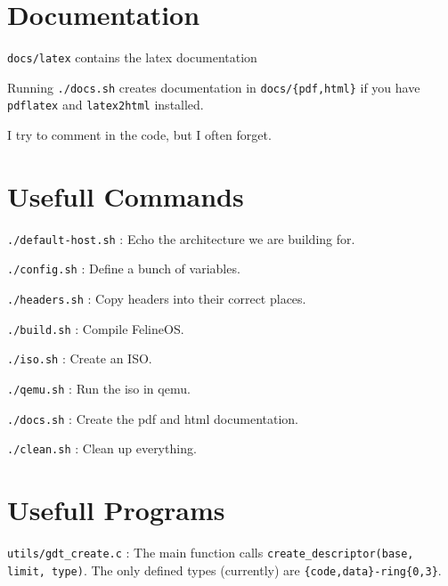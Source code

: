 \documentclass[12pt]{article}
\newcommand{\code}[1]{\colorbox{light-gray}{\texttt{#1}}}
\begin{document}
\section{Documentation}
\begin{list}{}{}
\item \code{docs/latex} contains the latex documentation
\item Running \code{./docs.sh} creates documentation in \code{docs/\{pdf,html\}} if you have \code{pdflatex} and \code{latex2html} installed.
\item I try to comment in the code, but I often forget.
\end{list}

\section{Usefull Commands}
\begin{list}{}{}
\item \code{./default-host.sh} : Echo the architecture we are building for.
\item \code{./config.sh} : Define a bunch of variables.
\item \code{./headers.sh} : Copy headers into their correct places.
\item \code{./build.sh} : Compile FelineOS.
\item \code{./iso.sh} : Create an ISO.
\item \code{./qemu.sh} : Run the iso in qemu.
\item \code{./docs.sh} : Create the pdf and html documentation.
\item \code{./clean.sh} : Clean up everything.
\end{list}

\section{Usefull Programs}
\begin{list}{}{}
\item \code{utils/gdt\_create.c} : The main function calls \code{create\_descriptor(base, limit, type)}. The only defined types (currently) are \code{\{code,data\}-ring\{0,3\}}.
\end{list}
\end{document}

